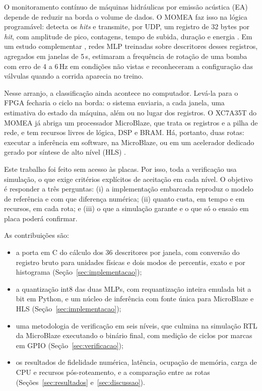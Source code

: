 \documentclass[12pt]{article}
\begin{document}
O monitoramento contínuo de máquinas hidráulicas por emissão acústica (EA) depende de reduzir na borda o volume de dados. O MOMEA faz isso na lógica programável: detecta os \textit{hits} e transmite, por UDP, um registro de 32 bytes por \textit{hit}, com amplitude de pico, contagens, tempo de subida, duração e energia \cite{unnthorsson2013,vallen2022}. Em um estudo complementar \cite{mlpbomba2026}, redes MLP treinadas sobre descritores desses registros, agregados em janelas de 5\,s, estimaram a frequência de rotação de uma bomba com erro de 4 a 6\,Hz em condições não vistas e reconheceram a configuração das válvulas quando a corrida aparecia no treino.

Nesse arranjo, a classificação ainda acontece no computador. Levá-la para o FPGA fecharia o ciclo na borda: o sistema enviaria, a cada janela, uma estimativa do estado da máquina, além ou no lugar dos registros. O XC7A35T do MOMEA já abriga um processador MicroBlaze, que trata os registros e a pilha de rede, e tem recursos livres de lógica, DSP e BRAM. Há, portanto, duas rotas: executar a inferência em software, na MicroBlaze, ou em um acelerador dedicado gerado por síntese de alto nível (HLS) \cite{amd_ug1399,duarte2018}.

Este trabalho foi feito sem acesso às placas. Por isso, toda a verificação usa simulação, o que exige critérios explícitos de aceitação em cada nível. O objetivo é responder a três perguntas: (i) a implementação embarcada reproduz o modelo de referência e com que diferença numérica; (ii) quanto custa, em tempo e em recursos, em cada rota; e (iii) o que a simulação garante e o que só o ensaio em placa poderá confirmar.

As contribuições são:
\begin{itemize}
	\item a porta em C do cálculo dos 36 descritores por janela, com conversão do registro bruto para unidades físicas e dois modos de percentis, exato e por histograma (Seção~\ref{sec:implementacao});
	\item a quantização int8 das duas MLPs, com requantização inteira emulada bit a bit em Python, e um núcleo de inferência com fonte única para MicroBlaze e HLS (Seção~\ref{sec:implementacao});
	\item uma metodologia de verificação em seis níveis, que culmina na simulação RTL da MicroBlaze executando o binário final, com medição de ciclos por marcas em GPIO (Seção~\ref{sec:verificacao});
	\item os resultados de fidelidade numérica, latência, ocupação de memória, carga de CPU e recursos pós-roteamento, e a comparação entre as rotas (Seções~\ref{sec:resultados} e~\ref{sec:discussao}).
\end{itemize}
\end{document}

